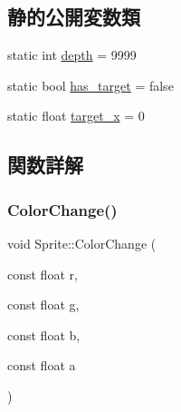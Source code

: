 \subsection*{静的公開変数類}
\begin{DoxyCompactItemize}
\item 
static int \mbox{\hyperlink{class_sprite_a9acc35b192b4150fe31b9386f7f9fc78}{depth}} = 9999
\item 
static bool \mbox{\hyperlink{class_sprite_ad4340ffd8b88519c28822eb2e9b71bf0}{has\+\_\+target}} = false
\item 
static float \mbox{\hyperlink{class_sprite_add18808500d3dca23d496757bf10259a}{target\+\_\+x}} = 0
\end{DoxyCompactItemize}


\subsection{関数詳解}
\mbox{\label{class_sprite_a0a3daa8677d1205981e27bd698025afa}} 
\subsubsection{\texorpdfstring{Color\+Change()}{ColorChange()}}
{\footnotesize\ttfamily void Sprite\+::\+Color\+Change (\begin{DoxyParamCaption}\item[{const float}]{r,  }\item[{const float}]{g,  }\item[{const float}]{b,  }\item[{const float}]{a }\end{DoxyParamCaption})\hspace{0.3cm}{\ttfamily [inline]}}

\mbox{\label{class_sprite_a65b9b470731149992bfa7401ffb676ae}} 
